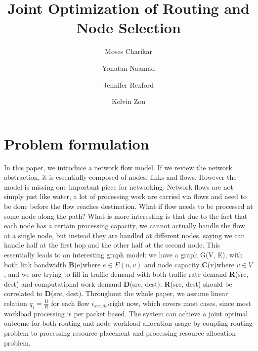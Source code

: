 \documentclass[twoside,leqno, 11pt]{article}
\begin{document}
\title{\Large  Joint Optimization of Routing and Node Selection}
\author[]{Moses Charikar}
\author[]{Yonatan Naamad}
\author[]{Jennifer Rexford}
\author[]{Kelvin Zou}
\date{}

\maketitle

 \section{Problem formulation} In this paper, we introduce a network flow model. If we review the network abstraction, it is essentially composed of nodes, links and flows. However the model is missing one important piece for networking. Network flows are not simply just like water, a lot of processing work are carried via flows and need to be done before the flow reaches destination. What if flow needs to be processed at some node along the path? What is more interesting is that due to the fact that each node has a certain processing capacity, we cannot actually handle the flow at a single node, but instead they are handled at different nodes, saying we can handle half at the first hop and the other half at the second node. This essentially leads to an interesting graph model: we have a graph G(V, E), with both link bandwidth \textbf{B}(e)where $e \in E(u,v)$ and node capacity \textbf{C}(v)where $v \in V $, and we are trying to fill in traffic demand with both traffic rate demand \textbf{R}(src, dest) and computational work demand \textbf{D}(src, dest). \textbf{R}(src, dest) should be correlated to \textbf{D}(src, dest). Throughout the whole paper, we assume linear relation $q_i = \frac{D}{R}$ for each flow $ i_{src,dst} $right now, which covers most cases, since most workload processing is per packet based. The system can achieve a joint optimal outcome for both routing and node workload allocation usage by coupling routing problem to processing resource placement and processing resource allocation problem.  
 
\end{document}
